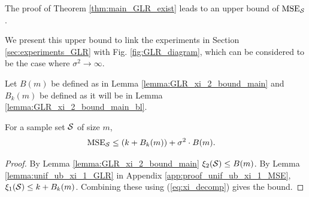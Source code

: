 {%
The proof of Theorem \ref{thm:main_GLR_exist} leads to an upper bound of $\text{MSE}_{\mathcal{S}}$. {\color{black} We present this upper bound to link the experiments in Section \ref{sec:experiments_GLR} with Fig. \ref{fig:GLR_diagram}, which can be considered to be the case where $\sigma^{2} \to \infty$.
\begin{corollary}
\label{corr:unif_ub_xi_1_MSE}
    Let $B(m)$ be defined as in Lemma \ref{lemma:GLR_xi_2_bound_main} and $B_{k}(m)$ be defined as it will be in Lemma \ref{lemma:GLR_xi_2_bound_main_bl}. 
    
    For a sample set $\mathcal{S}$ of size $m$,
    \begin{align}
    \textrm{MSE}_{\mathcal{S}} &\leq (k + B_{k}(m)) + \sigma^{2} \cdot B(m). \label{eq:unif_ub_MSE}
    \end{align}
\end{corollary}
\begin{proof}
By Lemma \ref{lemma:GLR_xi_2_bound_main} $\xi_{2}(\mathcal{S}) \leq B(m)$. By Lemma \ref{lemma:unif_ub_xi_1_GLR} in Appendix \ref{app:proof_unif_ub_xi_1_MSE}, $\xi_{1}(\mathcal{S}) \leq k + B_{k}(m)$. Combining these using (\ref{eq:xi_decomp}) gives the bound.
\end{proof}
}

 
\iffalse
\begin{remark}
\label{remark:mopt}
Assume $N > 4$ and define
\begin{align}
    m_{opt} = \min \argmin_{m \in [1,N] \cap \mathbb{Z}} B(m).
\end{align}

    If (\ref{eq:GLR_exist_thm_B_constraint}) in Theorem \ref{thm:main_GLR_exist} holds for some $m \in [1,N]$
    then 
    \begin{itemize}
        \item Condition (\ref{eq:GLR_exist_thm_B_constraint}) holds at a sample size of $m_{opt}$ .
        \item $\mu_{ub}(m)$ and $\tau_{lb}(\mu,m)$ are both maximised at $m=m_{opt}$.
        \item The MSE upper bound in Corollary \ref{corr:unif_ub_xi_1_MSE} is minimised at a sample size of $m_{opt}$.
        \item $m_{opt} \in \left[\left\lfloor\sqrt{N}\right\rfloor, \left\lceil\sqrt{rN}\right\rceil \right]$ and $m_{opt} \leq \frac{N}{2}$.
    \end{itemize}
\end{remark}
\begin{proof}
    See Appendix \ref{app:proof_of_remark_GLR_mopt}.
\end{proof}
\fi




}
